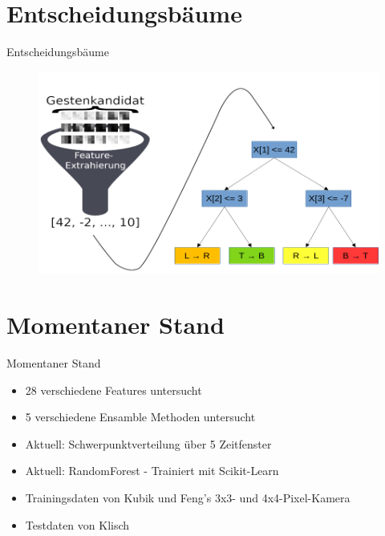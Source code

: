 \documentclass[10pt]{beamer}
\begin{document}
\section{Entscheidungsbäume}
\begin{frame}{Entscheidungsbäume}
\begin{figure}
    \centering
    \includegraphics[width=\linewidth]{process_draw.png}
\end{figure}
\end{frame}

\section{Momentaner Stand}
\begin{frame}{Momentaner Stand}
\begin{itemize}
    \item 28 verschiedene Features untersucht
    \item 5 verschiedene Ensamble Methoden untersucht
    \item Aktuell: Schwerpunktverteilung über 5 Zeitfenster
    \item Aktuell: RandomForest - Trainiert mit Scikit-Learn
    \item Trainingsdaten von Kubik und Feng's 3x3- und 4x4-Pixel-Kamera
    \item Testdaten von Klisch
\end{itemize}
\end{frame}
\end{document}
